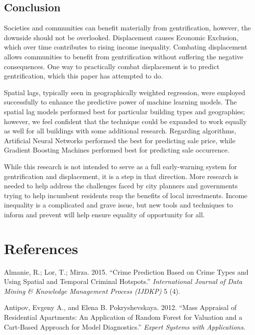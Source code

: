 \documentclass[12pt,]{article}
\begin{document}
\hypertarget{conclusion}{%
\subsection{Conclusion}\label{conclusion}}

Societies and communities can benefit materially from gentrification,
however, the downside should not be overlooked. Displacement causes
Economic Exclusion, which over time contributes to rising income
inequality. Combating displacement allows communities to benefit from
gentrification without suffering the negative consequences. One way to
practically combat displacement is to predict gentrification, which this
paper has attempted to do.

Spatial lags, typically seen in geographically weighted regression, were
employed successfully to enhance the predictive power of machine
learning models. The spatial lag models performed best for particular
building types and geographies; however, we feel confident that the
technique could be expanded to work equally as well for all buildings
with some additional research. Regarding algorithms, Artificial Neural
Networks performed the best for predicting sale price, while Gradient
Boosting Machines performed best for predicting sale occurrence.

While this research is not intended to serve as a full early-warning
system for gentrification and displacement, it is a step in that
direction. More research is needed to help address the challenges faced
by city planners and governments trying to help incumbent residents reap
the benefits of local investments. Income inequality is a complicated
and grave issue, but new tools and techniques to inform and prevent will
help ensure equality of opportunity for all.

\newpage

\hypertarget{references}{%
\section*{References}\label{references}}

\hypertarget{refs}{}
\leavevmode\hypertarget{ref-Almanie2015}{}%
Almanie, R.; Lor, T.; Mirza. 2015. ``Crime Prediction Based on Crime
Types and Using Spatial and Temporal Criminal Hotspots.''
\emph{International Journal of Data Mining \& Knowledge Management
Process (IJDKP)} 5 (4).

\leavevmode\hypertarget{ref-antipov12}{}%
Antipov, Evgeny A., and Elena B. Pokryshevskaya. 2012. ``Mass Appraisal
of Residential Apartments: An Application of Random Forest for Valuation
and a Cart-Based Approach for Model Diagnostics.'' \emph{Expert Systems
with Applications}.
\end{document}
